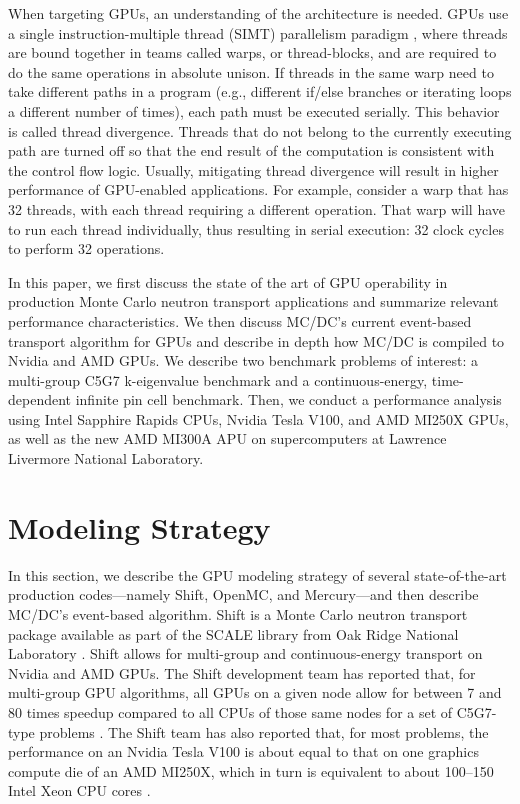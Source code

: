 When targeting GPUs, an understanding of the architecture is needed.
GPUs use a single instruction-multiple thread (SIMT) parallelism paradigm \cite{cuda}, where threads are bound together in teams called warps, or thread-blocks, and are required to do the same operations in absolute unison. 
If threads in the same warp need to take different paths in a program (e.g., different if/else branches or iterating loops a different number of times), each path must be executed serially. 
This behavior is called thread divergence.
Threads that do not belong to the currently executing path are turned off so that the end result of the computation is consistent with the control flow logic.
Usually, mitigating thread divergence will result in higher performance of GPU-enabled applications.
For example, consider a warp that has 32 threads, with each thread requiring a different operation.
That warp will have to run each thread individually, thus resulting in serial execution: 32 clock cycles to perform 32 operations.

In this paper, we first discuss the state of the art of GPU operability in production Monte Carlo neutron transport applications and summarize relevant performance characteristics.
We then discuss MC/DC's current event-based transport algorithm for GPUs and describe in depth how MC/DC is compiled to Nvidia and AMD GPUs.
We describe two benchmark problems of interest: a multi-group C5G7 k-eigenvalue benchmark and a continuous-energy, time-dependent infinite pin cell benchmark.
Then, we conduct a performance analysis using Intel Sapphire Rapids CPUs, Nvidia Tesla V100, and AMD MI250X GPUs, as well as the new AMD MI300A APU on supercomputers at Lawrence Livermore National Laboratory.

\section{Modeling Strategy}
\label{sec:modeling_strat}

In this section, we describe the GPU modeling strategy of several state-of-the-art production codes---namely Shift, OpenMC, and Mercury---and then describe MC/DC's event-based algorithm.
Shift is a Monte Carlo neutron transport package available as part of the SCALE library from Oak Ridge National Laboratory \cite{pandya_implementation_2016}.
Shift allows for multi-group and continuous-energy transport on Nvidia and AMD GPUs.
The Shift development team has reported that, for multi-group GPU algorithms, all GPUs on a given node allow for between 7 and 80 times speedup compared to all CPUs of those same nodes for a set of C5G7-type problems \cite{hamilton_multigroup_2018}.
The Shift team has also reported that, for most problems, the performance on an Nvidia Tesla V100 is about equal to that on one graphics compute die of an AMD MI250X, which in turn is equivalent to about 100--150 Intel Xeon CPU cores \cite{mcsummit}.

